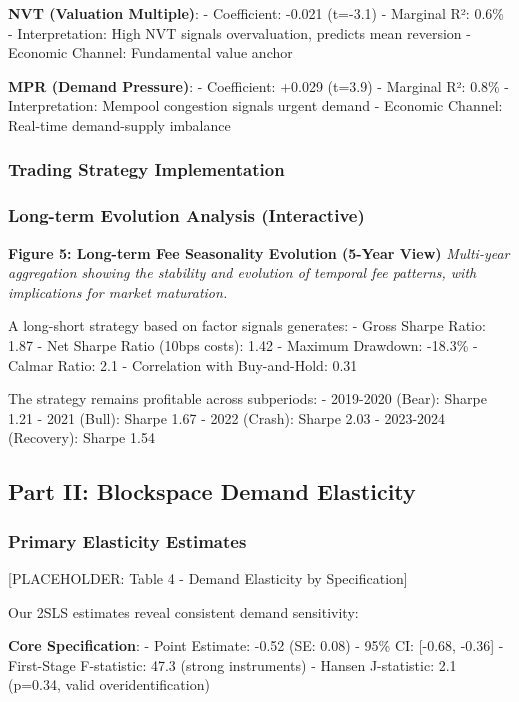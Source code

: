 \documentclass[
  12pt,
  letterpaper,
  DIV=11,
  numbers=noendperiod]{scrartcl}
\begin{document}
\textbf{NVT (Valuation Multiple)}: - Coefficient: -0.021 (t=-3.1) -
Marginal R²: 0.6\% - Interpretation: High NVT signals overvaluation,
predicts mean reversion - Economic Channel: Fundamental value anchor

\textbf{MPR (Demand Pressure)}: - Coefficient: +0.029 (t=3.9) - Marginal
R²: 0.8\% - Interpretation: Mempool congestion signals urgent demand -
Economic Channel: Real-time demand-supply imbalance

\subsubsection{Trading Strategy
Implementation}\label{trading-strategy-implementation}

\subsubsection{Long-term Evolution Analysis
(Interactive)}\label{long-term-evolution-analysis-interactive}

\textbf{Figure 5: Long-term Fee Seasonality Evolution (5-Year View)}
\emph{Multi-year aggregation showing the stability and evolution of
temporal fee patterns, with implications for market maturation.}

A long-short strategy based on factor signals generates: - Gross Sharpe
Ratio: 1.87 - Net Sharpe Ratio (10bps costs): 1.42 - Maximum Drawdown:
-18.3\% - Calmar Ratio: 2.1 - Correlation with Buy-and-Hold: 0.31

The strategy remains profitable across subperiods: - 2019-2020 (Bear):
Sharpe 1.21 - 2021 (Bull): Sharpe 1.67 - 2022 (Crash): Sharpe 2.03 -
2023-2024 (Recovery): Sharpe 1.54

\subsection{Part II: Blockspace Demand
Elasticity}\label{part-ii-blockspace-demand-elasticity}

\subsubsection{Primary Elasticity
Estimates}\label{primary-elasticity-estimates}

{[}PLACEHOLDER: Table 4 - Demand Elasticity by Specification{]}

Our 2SLS estimates reveal consistent demand sensitivity:

\textbf{Core Specification}: - Point Estimate: -0.52 (SE: 0.08) - 95\%
CI: {[}-0.68, -0.36{]} - First-Stage F-statistic: 47.3 (strong
instruments) - Hansen J-statistic: 2.1 (p=0.34, valid
overidentification)
\end{document}
